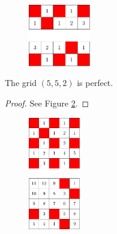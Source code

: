 \begin{figure}[H]
\centering
\includegraphics[width=0.24\textwidth]{figures/7/2x5x2_numbered_heatmap.pdf}
\caption{}
\label{fig:2x5x2_numbered_heatmap}
\end{figure} 

\newpage

\begin{con}
\label{con:5x5x2}
The grid $(5,5,2)$ is perfect.
\end{con}

\begin{proof}
See Figure \ref{fig:5x5x2_numbered_heatmap}.
\end{proof}

\begin{figure}[H]
\centering
\includegraphics[width=0.2\textwidth]{figures/A/5x5x2_numbered_heatmap.pdf}
\caption{}
\label{fig:5x5x2_numbered_heatmap}
\end{figure}




